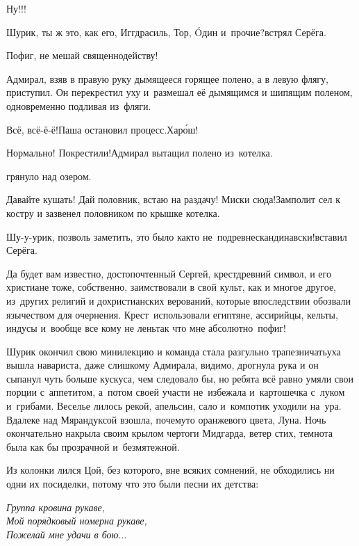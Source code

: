\diagdash Ну!!!

\diagdash Шурик, ты ж это, как его, Иггдрасиль, Тор, {\'{O}}дин и~прочие?\mdash встрял Серёга.

\diagdash Пофиг, не мешай священнодейству!

Адмирал, взяв в правую руку дымящееся горящее полено, а в левую флягу, приступил. Он перекрестил уху и~размешал её дымящимся и шипящим поленом, одновременно подливая из~фляги.

\diagdash Всё, всё-ё-ё!\mdash Паша остановил процесс.\mdash Хар{\'о}ш!

\diagdash Нормально! Покрестили!\mdash Адмирал вытащил полено из~котелка.

\mdash грянуло над озером.

\diagdash Давайте кушать! Дай половник, встаю на раздачу! Миски сюда!\mdash Замполит сел к костру и зазвенел половником по крышке котелка.

\diagdash Шу-у-урик, позволь заметить, это было как\sdash то не~по\sdash древнескандинавски!\mdash вставил Серёга.

\diagdash Да будет вам известно, достопочтенный Сергей, крест\mdash древний символ, и его христиане тоже, собственно, заимствовали в свой культ, как и многое другое, из~других религий и дохристианских верований, которые впоследствии обозвали язычеством для очернения. Крест~использовали египтяне, ассирийцы, кельты, индусы и~вообще все кому не лень\mdash так что мне абсолютно~пофиг! 

Шурик окончил свою мини\sdash лекцию и команда стала разгульно трапезничать\mdash уха вышла навариста, даже слишком\mdash у Адмирала, видимо, дрогнула рука и он сыпанул чуть больше кус\sdash куса, чем следовало бы, но ребята всё равно умяли свои порции с~аппетитом, а~потом своей участи не~избежала и~картошечка с~луком и~грибами. Веселье лилось рекой, апельсин, сало и~компотик уходили на~ура. Вдалеке над Мярандуксой взошла, почему\sdash то оранжевого цвета, Луна. Ночь окончательно накрыла своим крылом чертоги Мидгарда, ветер стих, темнота была как бы прозрачной и~безмятежной.

Из колонки лился Цой, без которого, вне всяких сомнений, не обходились ни одни их посиделки, потому что это были песни их детства:

\vspace{0.1cm}
\noindent\textit{%
	\hspace*{2.5cm}Группа крови\mdash на рукаве,\\	
	\hspace*{2.5cm}Мой порядковый номер\mdash на рукаве,\\
	\hspace*{2.5cm}Пожелай мне удачи в бою$\ldots$%
}

